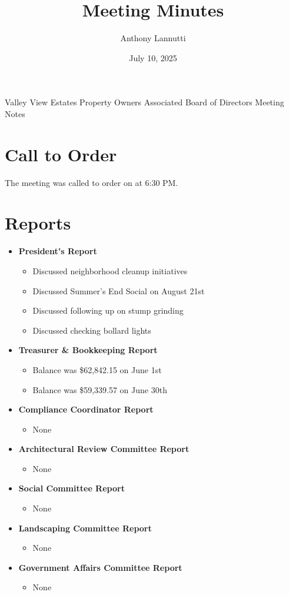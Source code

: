 \documentclass[12pt,a4paper]{article}
\author{Anthony Lannutti}
\date{July 10, 2025}
\title{Meeting Minutes}
\begin{document}
\begin{center}
  Valley View Estates Property Owners Associated Board of Directors Meeting Notes\break{}
  \@date{}
\end{center}

\section*{Call to Order}
\begin{flushleft}
The meeting was called to order on \@date{} at 6:30 PM\@.
\end{flushleft}


\section*{Reports}
\begin{itemize}
  \item \textbf{President's Report}
  \begin{itemize}
    \item Discussed neighborhood cleanup initiatives
    \item Discussed Summer's End Social on August 21st
    \item Discussed following up on stump grinding
    \item Discussed checking bollard lights
  \end{itemize}
  \item \textbf{Treasurer \& Bookkeeping Report}
  \begin{itemize}
    \item Balance was \$62,842.15 on June 1st
    \item Balance was \$59,339.57 on June 30th
  \end{itemize}
  \item \textbf{Compliance Coordinator Report}
  \begin{itemize}
    \item None
  \end{itemize}
  \item \textbf{Architectural Review Committee Report}
  \begin{itemize}
    \item None
  \end{itemize}
  \item \textbf{Social Committee Report}
  \begin{itemize}
    \item None
  \end{itemize}
  \item \textbf{Landscaping Committee Report}
  \begin{itemize}
    \item None
  \end{itemize}
  \item \textbf{Government Affairs Committee Report}
  \begin{itemize}
    \item None
  \end{itemize}
\end{itemize}
\end{document}
